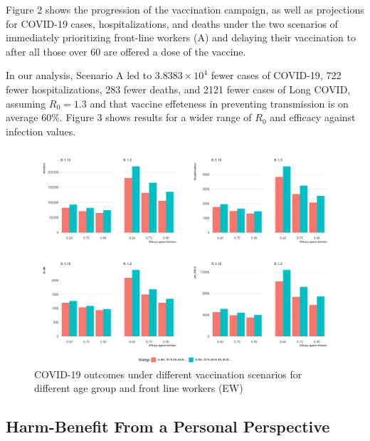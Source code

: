 \documentclass[]{interact}
\theoremstyle{plain}%
\theoremstyle{definition}
\theoremstyle{remark}
\begin{document}
Figure 2 shows the progression of the vaccination campaign, as well as
projections for COVID-19 cases, hospitalizations, and deaths under the
two scenarios of immediately prioritizing front-line workers (A) and
delaying their vaccination to after all those over 60 are offered a dose
of the vaccine.

In our analysis, Scenario A led to \ensuremath{3.8383\times 10^{4}}
fewer cases of COVID-19, 722 fewer hospitalizations, 283 fewer deaths,
and 2121 fewer cases of Long COVID, assuming \(R_0=1.3\) and that
vaccine effeteness in preventing transmission is on average 60\%. Figure
3 shows results for a wider range of \(R_0\) and efficacy against
infection values.

\begin{figure}

{\centering \includegraphics[width=1\linewidth]{../figures/fig-barplots} 

}

\caption{COVID-19 outcomes under different vaccination scenarios for different age group and front line workers (EW)}\label{fig:fig2}
\end{figure}

\hypertarget{harm-benefit-from-a-personal-perspective}{%
\subsection{Harm-Benefit From a Personal
Perspective}\label{harm-benefit-from-a-personal-perspective}}
\end{document}
